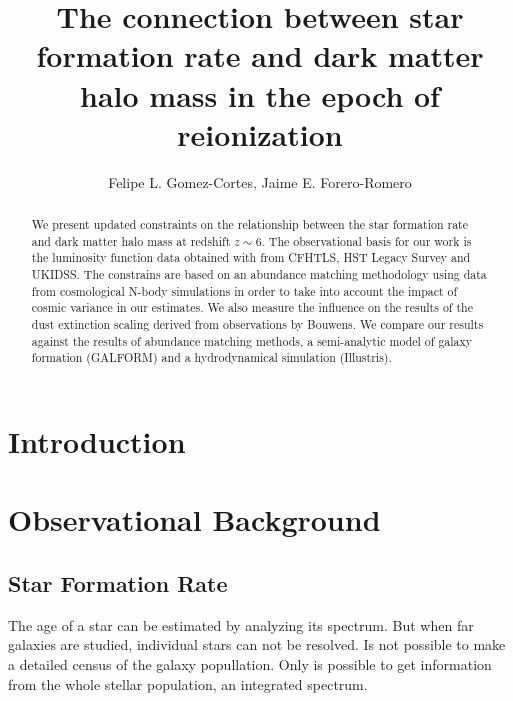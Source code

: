 \documentclass{emulateapj}
\begin{document}
\title{The connection between star formation rate and dark matter halo
  mass in the epoch of reionization}  


\author{Felipe L. Gomez-Cortes, Jaime E. Forero-Romero}  

\begin{abstract}
We present updated constraints on the relationship between the star
formation rate and dark matter halo mass at redshift $z\sim 6$.
The observational basis for our work is the luminosity function data
obtained with from CFHTLS, HST Legacy Survey and UKIDSS.
The constrains are based on an abundance matching methodology using data
from cosmological N-body simulations in order to take into account the impact
of cosmic variance in our estimates.
We also measure the influence on the results of the dust extinction
scaling derived from observations by Bouwens.
We compare our results against the results of abundance matching
methods, a semi-analytic model of galaxy formation (GALFORM) and a
hydrodynamical simulation (Illustris).
\end{abstract}


\section{Introduction}
\label{sec:intro}



 
\section{Observational Background}
\label{sec:theo}

\subsection{Star Formation Rate}

The age of a star can be estimated by analyzing its spectrum. But when far
galaxies are studied, individual stars can not be resolved. Is not 
possible to make a detailed census of the galaxy popullation. Only is possible 
to get information from the whole stellar population, an integrated spectrum.
\end{document}
